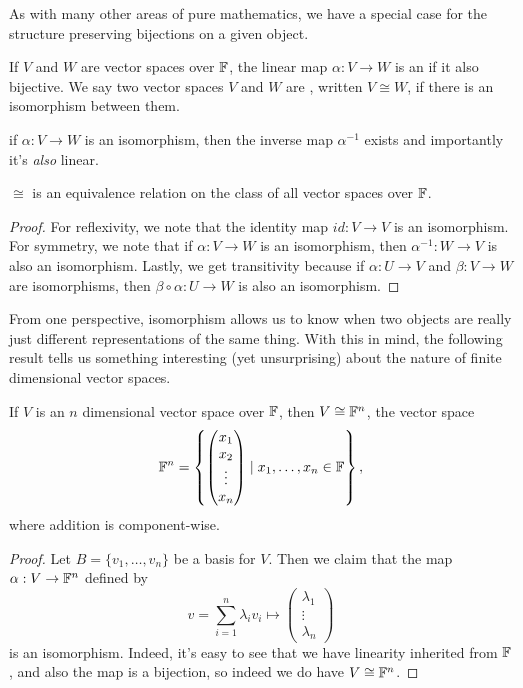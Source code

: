 \documentclass[a4paper]{scrartcl}
\begin{document}
As with many other areas of pure mathematics, we have a special case for the structure preserving bijections on a given object.

\begin{definition}[Isomorphism]
    If $V$ and $W$ are vector spaces over $\mathbb{F}$, the linear map $\alpha: V \rightarrow W$ is an  if it also bijective. We say two vector spaces $V$ and $W$ are , written $V \cong W$, if there is an isomorphism between them.
\end{definition}

\begin{remark}
    if $\alpha:V \rightarrow W$ is an isomorphism, then the inverse map $\alpha^{-1}$ exists and importantly it's \emph{also} linear.
\end{remark}

\begin{lemma}
    $\cong$ is an equivalence relation on the class of all vector spaces over $\mathbb{F}$.
\end{lemma}
\begin{proof}
    For reflexivity, we note that the identity map $id: V \rightarrow V$ is an isomorphism. For symmetry, we note that if $\alpha: V \rightarrow W$ is an isomorphism, then $\alpha^{-1}: W \rightarrow V$ is also an isomorphism. Lastly, we get transitivity because if $\alpha: U \rightarrow V$ and $\beta: V \rightarrow W$ are isomorphisms, then $\beta \circ \alpha: U \rightarrow W$ is also an isomorphism.
\end{proof}

From one perspective, isomorphism allows us to know when two objects are really just different representations of the same thing. With this in mind, the following result tells us something interesting (yet unsurprising) about the nature of finite dimensional vector spaces.


\begin{theorem}
    If $V$ is an $n$ dimensional vector space over $\mathbb{F}$, then $V \cong \mathbb{F}^n$, the vector space
    $$
    \mathbb{F}^n = \left\{\begin{pmatrix}x_1 \\ x_2 \\ \vdots \\ x_n\end{pmatrix} \mid x_1, \dots, x_n \in \mathbb{F} \right\},
    $$
    where addition is component-wise.
\end{theorem}
\begin{proof}
    Let $B = \{v_1, \dots, v_n\}$ be a basis for $V$. Then we claim that the map $\alpha: V \rightarrow \mathbb{F}^n$ defined by 
    $$
    v = \sum_{i = 1}^n \lambda_i v_i \longmapsto \begin{pmatrix}\lambda_1 \\ \vdots \\ \lambda_n\end{pmatrix}
    $$
    is an isomorphism. Indeed, it's easy to see that we have linearity inherited from $\mathbb{F}$, and also the map is a bijection, so indeed we do have $V \cong \mathbb{F}^n$.
\end{proof}
\end{document}
